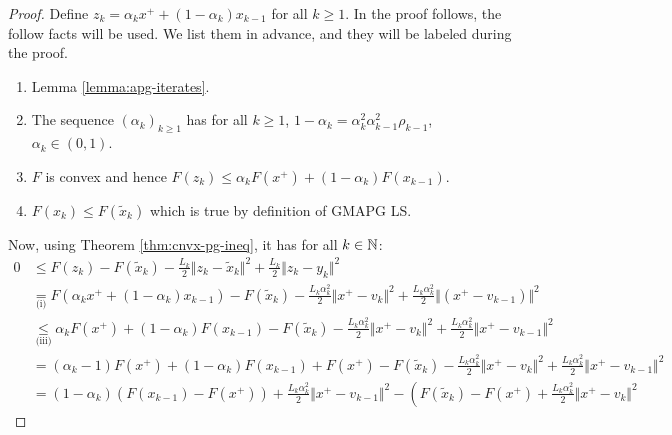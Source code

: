\documentclass[12pt]{report}
\begin{document}
        \begin{proof}
            Define $z_k = \alpha_k x^+ + (1 - \alpha_k)x_{k - 1}$ for all $k \ge 1$. 
            In the proof follows, the follow facts will be used. 
            We list them in advance, and they will be labeled during the proof. 
            \begin{enumerate}
                \item Lemma \ref{lemma:apg-iterates}. 
                \item The sequence $(\alpha_k)_{k \ge 1}$ has for all $k \ge 1$, $1 - \alpha_k = \alpha_k^2\alpha_{k - 1}^2\rho_{k - 1}$, $\alpha_k \in (0, 1)$. 
                \item $F$ is convex and hence $F(z_k) \le \alpha_k F(x^+) + (1 - \alpha_k)F(x_{k - 1})$. 
                \item $F(x_k) \le F(\tilde x_k)$ which is true by definition of GMAPG LS. 
            \end{enumerate}
            Now, using Theorem \ref{thm:cnvx-pg-ineq}, it has for all $k \in \mathbb N$: 
            {\allowdisplaybreaks\small
            \begin{align*}
                0 &\le 
                F(z_k) 
                - F(\tilde x_k) - \frac{L_k}{2}\Vert z_k - \tilde x_k\Vert^2 + 
                \frac{L_k}{2}\Vert z_k - y_k\Vert^2
                \\
                &\underset{\text{(i)}}{=}
                F(\alpha_k x^+ + (1 - \alpha_k)x_{k - 1}) - F(\tilde x_k)
                - \frac{L_k\alpha_k^2}{2}\Vert x^+ - v_k \Vert^2 
                + \frac{L_k\alpha_k^2}{2}\Vert(x^+ - v_{k - 1})\Vert^2
                \\
                &\underset{\text{(iii)}}{\le} 
                \alpha_k F(x^+) + (1 - \alpha_k) F(x_{k - 1}) - F(\tilde x_k)
                - \frac{L_k\alpha_k^2}{2}\Vert x^+ - v_k \Vert^2 
                + \frac{L_k\alpha_k^2}{2}\Vert x^+ - v_{k - 1} \Vert^2
                \\
                &= 
                (\alpha_k - 1)F(x^+) + (1 - \alpha_k) F(x_{k - 1}) + F(x^+) - F(\tilde x_k)
                - \frac{L_k\alpha_k^2}{2}\Vert x^+ - v_k \Vert^2 
                + \frac{L_k\alpha_k^2}{2}\Vert x^+ - v_{k - 1}\Vert^2
                \\
                &= 
                (1 - \alpha_k)(F(x_{k - 1}) - F(x^+)) + \frac{L_k\alpha_k^2}{2}\Vert x^+ - v_{k - 1}\Vert^2
                - \left(
                    F(\tilde x_k) - F(x^+) + \frac{L_k\alpha_k^2}{2}\Vert x^+ - v_k\Vert^2

\end{align*}}
\end{proof}
\end{document}
